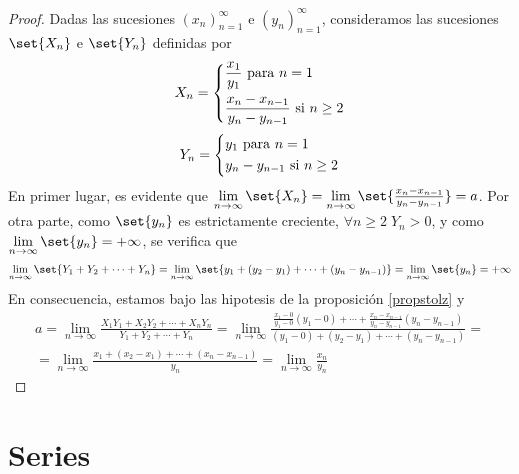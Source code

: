 \begin{proof}
	Dadas las sucesiones \((x_n)^{\infty}_{n=1}  \) e \((y_n)^{\infty}_{n=1} \), consideramos las sucesiones \(\set{X_n }\) e \(\set{Y_n }\) definidas por
	\[
		X_n = \begin{dcases}
			\frac{x_1 }{y_1 } \text{ para } n = 1 \\
			\frac{x_n - x_{n-1}}{y_n - y_{n-1 }} \text{ si } n \geq  2
		\end{dcases}
	\]
	\[
		Y_n = \begin{dcases}
			y_1 \text{ para } n = 1 \\
			y_n - y_{n-1} \text{ si } n \geq  2
		\end{dcases}
	\]
	En primer lugar, es evidente que \(\lim\limits_{n \to \infty} \set{X_n} = \lim\limits_{n \to \infty} \set{\frac{x_n - x_{n-1}}{y_n - y_{n-1}}} = a\). Por otra parte, como \(\set{y_n }\) es estrictamente creciente, \(\forall n \geq 2\; Y_n > 0 \), y como \(\lim\limits_{n \to \infty} \set{y_n} = +\infty \), se verifica que
	\[
		\lim\limits_{n \to \infty} \set{Y_1 + Y_2 + \cdots + Y_n } = \lim\limits_{n \to \infty} \set{y_1 + (y_2 - y_1) + \cdots + (y_n - y_{n-1})} = \lim\limits_{n \to \infty} \set{y_n} = +\infty
	\]
	En consecuencia, estamos bajo las hipotesis de la proposición \ref{propstolz} y
	\begin{multline*}
		a = \lim\limits_{n \to \infty} \frac{X_1 Y_1 + X_2 Y_2 + \cdots + X_n Y_n }{Y_1 + Y_2 + \cdots + Y_n} = \lim\limits_{n \to \infty} \frac{\frac{x_1 - 0 }{y_1 - 0 }(y_1 - 0) + \cdots + \frac{x_n - x_{n-1}}{y_n - y_{n-1}}(y_n - y_{n-1})}{(y_1 - 0) + (y_2 - y_1) + \cdots + (y_n - y_{n-1})} = \\ = \lim\limits_{n \to \infty} \frac{x_1 + (x_2 - x_1) + \cdots + (x_n - x_{n-1})}{y_n} = \lim\limits_{n \to \infty} \frac{x_n }{y_n }
	\end{multline*}
\end{proof}

\part{Series}
